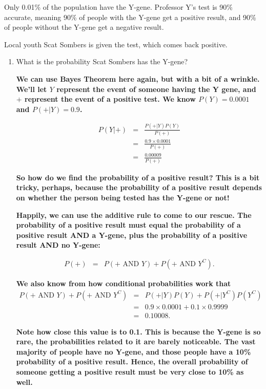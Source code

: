 \documentclass[11pt,a4paper]{article}
\begin{document}
\begin{enumerate}
Only 0.01\% of the population have the Y-gene. Professor Y's test is 90\% accurate, meaning 90\% of people with the Y-gene get a positive result, and 90\% of people without the Y-gene get a negative result.

Local youth Scat Sombers is given the test, which comes back positive.
\begin{enumerate}
\item What is the probability Scat Sombers has the Y-gene?

\textbf{We can use Bayes Theorem here again, but with a bit of a wrinkle. We'll let $Y$ represent the event of someone having the Y gene, and $+$ represent the event of a positive test. We know $P(Y)=0.0001$ and $P(+|Y)=0.9$.}


\textbf{
\begin{eqnarray*}
P(Y|+)&=&\frac{P(+|Y)P(Y)}{P(+)}\\
&=&\frac{0.9\times0.0001}{P(+)}\\
&=&\frac{0.00009}{P(+)}
\end{eqnarray*}
}

\textbf{So how do we find the probability of a positive result? This is a bit tricky, perhaps, because the probability of a positive result depends on whether the person being tested has the Y-gene or not!}

\textbf{Happily, we can use the additive rule to come to our rescue. The probability of a positive result must equal the probability of a positive result AND a Y-gene, plus the probability of a positive result AND no Y-gene:}

\textbf{
\begin{eqnarray*}
P(+)&=&P(+\textrm{ AND } Y) + P(+\textrm{ AND } Y^C).
\end{eqnarray*}
}

\textbf{We also know from how conditional probabilities work that}
\textbf{
\begin{eqnarray*}
P(+\textrm{ AND } Y) + P(+\textrm{ AND } Y^C)&=&P(+|Y)P(Y) + P(+|Y^C)P(Y^C)\\
&=&0.9\times0.0001+0.1\times0.9999\\
&=&0.10008.
\end{eqnarray*}
}

\textbf{Note how close this value is to 0.1. This is because the Y-gene is so rare, the probabilities related to it are barely noticeable. The vast majority of people have no Y-gene, and those people have a 10\% probability of a positive result. Hence, the overall probability of someone getting a positive result must be very close to 10\% as well.}


\end{enumerate}
\end{enumerate}
\end{document}
